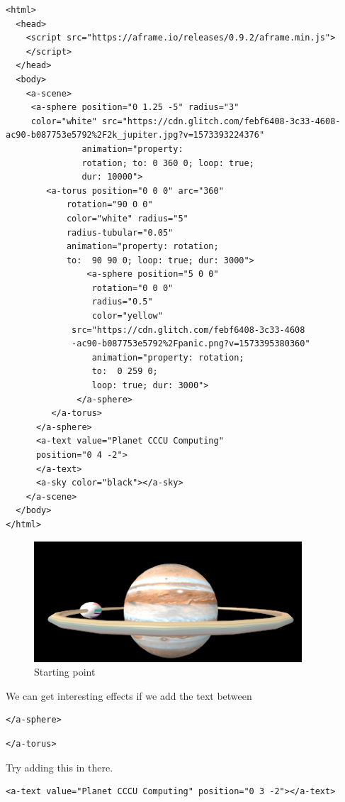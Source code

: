 \begin{lstlisting} 
<html>
  <head>
    <script src="https://aframe.io/releases/0.9.2/aframe.min.js">
    </script>
  </head>
  <body>
    <a-scene>
     <a-sphere position="0 1.25 -5" radius="3" 
     color="white" src="https://cdn.glitch.com/febf6408-3c33-4608-ac90-b087753e5792%2F2k_jupiter.jpg?v=1573393224376"
               animation="property: 
               rotation; to: 0 360 0; loop: true; 
               dur: 10000">
        <a-torus position="0 0 0" arc="360"
            rotation="90 0 0"
            color="white" radius="5"
            radius-tubular="0.05"
            animation="property: rotation; 
            to:  90 90 0; loop: true; dur: 3000">
                <a-sphere position="5 0 0"
                 rotation="0 0 0"
                 radius="0.5"
                 color="yellow"
             src="https://cdn.glitch.com/febf6408-3c33-4608
             -ac90-b087753e5792%2Fpanic.png?v=1573395380360"
                 animation="property: rotation; 
                 to:  0 259 0; 
                 loop: true; dur: 3000">
              </a-sphere>
         </a-torus>
      </a-sphere>   
      <a-text value="Planet CCCU Computing" 
      position="0 4 -2">
      </a-text>
      <a-sky color="black"></a-sky>
    </a-scene>
  </body>
</html>
\end{lstlisting}

\begin{figure}
    \centering
    \includegraphics[width=10cm]{chapters/chapter2/figures/Picture1.png}
    \caption{Starting point}
    \label{fig:Planet again}
\end{figure}

We can get interesting effects if we add the text between \begin{lstlisting}
</a-sphere>
\end{lstlisting}
\begin{lstlisting}
</a-torus>
\end{lstlisting}  

Try adding this in there. \begin{lstlisting}
<a-text value="Planet CCCU Computing" position="0 3 -2"></a-text>
\end{lstlisting}

